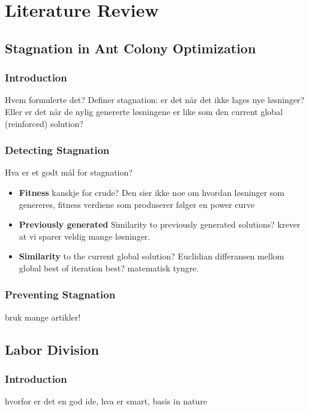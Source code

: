 \graphicspath{{chapters/chapter3/}}
\chapter{Literature Review}

\section{Stagnation in Ant Colony Optimization}

\subsection{Introduction}
Hvem formulerte det? Definer stagnation: er det når det ikke lages nye løsninger? Eller er det når de nylig genererte løsningene er like som den current global (reinforced) solution?

\subsection{Detecting Stagnation}
Hva er et godt mål for stagnation? 

\begin{itemize}
    \item[] \textbf{Fitness} kanskje for crude? Den sier ikke noe om hvordan løsninger som genereres, fitness verdiene som produserer følger en power curve
    \item[] \textbf{Previously generated} Similarity to previously generated solutions? krever at vi sparer veldig mange løsninger.
    \item[] \textbf{Similarity} to the current global solution? Euclidian differansen mellom global best of iteration best? matematisk tyngre.
\end{itemize}

\subsection{Preventing Stagnation}
bruk mange artikler!



\section{Labor Division}

\subsection{Introduction}
hvorfor er det en god ide, hva er smart, basis in nature

